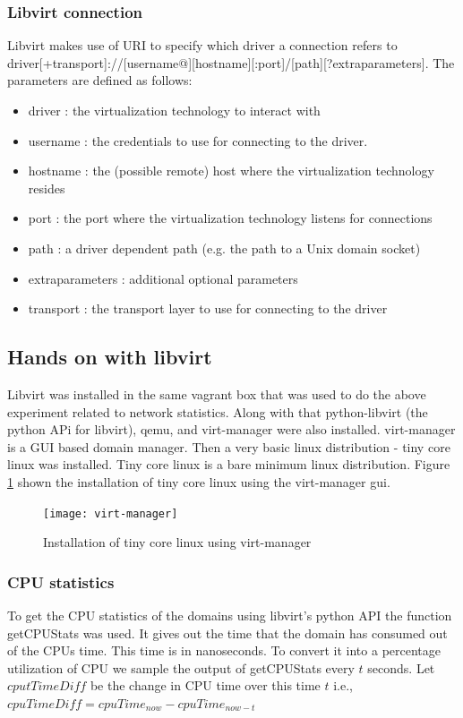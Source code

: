 \subsubsection{Libvirt connection}
Libvirt makes use of URI to specify which driver a connection refers to driver[+transport]://[username@][hostname][:port]/[path][?extraparameters]. The parameters are defined as follows:
\begin{itemize}
    \item driver : the virtualization technology to interact with
    \item username : the credentials to use for connecting to the driver.
    \item hostname : the (possible remote) host where the virtualization
technology resides
    \item port : the port where the virtualization technology listens for
connections
    \item path : a driver dependent path (e.g. the path to a Unix domain
socket)
    \item extraparameters : additional optional parameters
    \item transport : the transport layer to use for connecting to the driver
\end{itemize}


\subsection{Hands on with libvirt}
Libvirt was installed in the same vagrant box that was used to do the above experiment related to network statistics. Along with that python-libvirt (the python APi for libvirt), qemu, and virt-manager were also installed. virt-manager is a GUI based domain manager. Then a very basic linux distribution - tiny core linux was installed. Tiny core linux is a bare minimum linux distribution. Figure \ref{fig:virt-manager} shown the installation of tiny core linux using the virt-manager gui.
\pagebreak
\begin{figure}[h]
\begin{center}	
\texttt{[image: virt-manager]} 
\caption{Installation of tiny core linux using virt-manager}
\label{fig:virt-manager}
\end{center}
\end{figure}

\newpage
\subsubsection{CPU statistics}
To get the CPU statistics of the domains using libvirt's python API the function getCPUStats was used. It gives out the time that the domain has consumed out of the CPUs time. This time is in nanoseconds. To convert it into a percentage utilization of CPU we sample the output of getCPUStats every $t$ seconds. Let $cputTimeDiff$ be the change in CPU time over this time $t$ i.e., $cpuTimeDiff = cpuTime_{now} - cpuTime_{now-t}$

